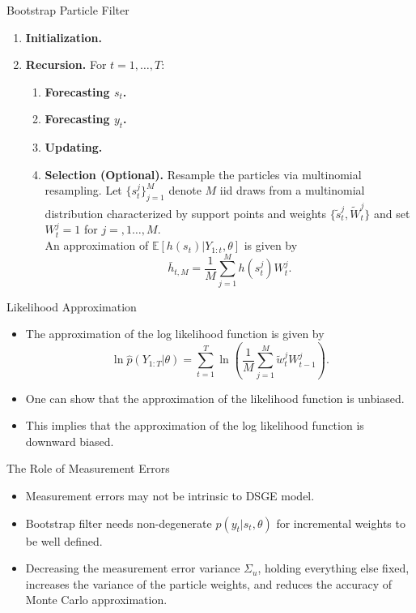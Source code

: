 \documentclass[presentation]{beamer}
\newcommand{\be}{\begin{equation}}
\newcommand{\ee}{\end{equation}}
\newcommand{\spitem}{\vspace{.3cm}\item}
\begin{document}
\begin{frame}[label={sec:org88a1b86}]{Bootstrap Particle Filter}
\begin{enumerate}
	\item {\bf Initialization.} 
	\item {\bf Recursion.} For $t=1,\ldots,T$:
	\begin{enumerate}
		\item {\bf Forecasting $s_t$.} 
		\item {\bf Forecasting $y_t$.} 
		\item {\bf Updating.} 
		\item {\bf Selection (Optional).} Resample the particles via
		multinomial resampling. Let $\{ s_t^j \}_{j=1}^M$ denote $M$ iid draws from
		a multinomial distribution characterized by support points and weights
		$\{ \tilde{s}_t^j,\tilde{W}_t^j \}$ and set $W_t^j=1$ for $j=,1\ldots,M$. \\
		An approximation of $\mathbb{E}[h(s_t)|Y_{1:t},\theta]$ is given by
		\be
		\bar{h}_{t,M} = \frac{1}{M} \sum_{j=1}^M h(s_t^j)W_{t}^j.
		\label{eq_pfhtt}
		\ee
	\end{enumerate}

\end{enumerate}
\end{frame}


\begin{frame}[label={sec:org1f8fd0c}]{Likelihood Approximation}
\begin{itemize}
	\item The approximation of the {\color{red} log likelihood function}
	is given by
	\be
	\ln \hat{p}(Y_{1:T}|\theta) = \sum_{t=1}^T \ln \left( \frac{1}{M} \sum_{j=1}^M \tilde{w}^j_t W_{t-1}^j \right).
	\ee
	\item One can show that the approximation of the {\color{blue} likelihood function is unbiased}.
	\spitem This implies that the approximation of the {\color{red} log likelihood function is downward biased.}
\end{itemize}
\end{frame}


\begin{frame}[label={sec:orgc3f723f}]{The Role of Measurement Errors}
\begin{itemize}
	\spitem Measurement errors may not be intrinsic to DSGE model.
	\spitem Bootstrap filter needs non-degenerate $p(y_t|s_t,\theta)$ for incremental weights to be well defined.
	\spitem Decreasing the measurement error variance $\Sigma_u$, holding everything else fixed, increases
		the variance of the particle weights, and reduces the accuracy of Monte Carlo approximation.
\end{itemize}
\end{frame}
\end{document}
